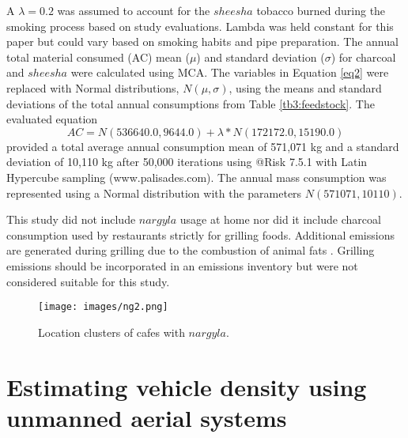 A $\lambda = 0.2$ was assumed to account for the $sheesha$ tobacco burned during the smoking process based on study evaluations.  Lambda was held constant for this paper but could vary based on smoking habits and pipe preparation.  The annual total material consumed (AC) mean ($\mu$) and standard deviation ($\sigma$) for charcoal and $sheesha$ were calculated using MCA.  The variables in Equation \ref{eq2} were replaced with Normal distributions, $N(\mu,\sigma)$,  using the means and standard deviations of the total annual consumptions from Table \ref{tb3:feedstock}.  The evaluated equation			
%
\begin{equation}
\label{eq7}
AC = N(536640.0,  9644.0) + \lambda*N(172172.0, 15190.0)
\end{equation}
%
\noindent
provided a total average annual consumption mean of 571,071 kg and a standard deviation of 10,110 kg after 50,000 iterations using @Risk 7.5.1 with Latin Hypercube sampling (www.palisades.com).  The annual mass consumption was represented using a Normal distribution with the parameters $N(571071, 10110)$.

This study did not include $nargyla$ usage at home nor did it include charcoal consumption used by restaurants strictly for grilling foods.  Additional emissions are generated during grilling due to the combustion of animal fats \citep{McDonald2003}.  Grilling emissions should be incorporated in an emissions inventory but were not considered suitable for this study.

%
\begin{figure}[H]
\texttt{[image: images/ng2.png]} 
\caption{Location clusters of cafes with $nargyla$.}
\label{figng2:cafes}
\end{figure}
%
\clearpage
\section{Estimating vehicle density using unmanned aerial systems}


